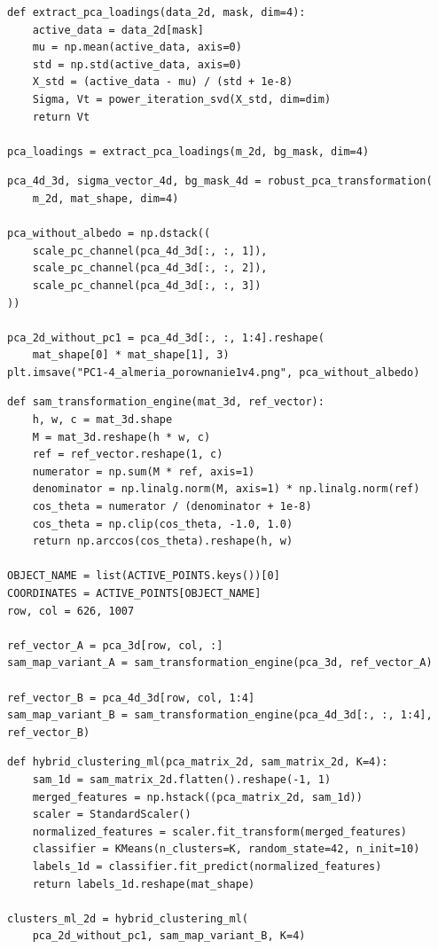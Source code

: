\documentclass[12pt,a4paper]{article}
\begin{document}
\begin{lstlisting}[caption={Calculation of PCA loadings.},label={lst:loadings}]
def extract_pca_loadings(data_2d, mask, dim=4):
    active_data = data_2d[mask]
    mu = np.mean(active_data, axis=0)
    std = np.std(active_data, axis=0)
    X_std = (active_data - mu) / (std + 1e-8)
    Sigma, Vt = power_iteration_svd(X_std, dim=dim)
    return Vt

pca_loadings = extract_pca_loadings(m_2d, bg_mask, dim=4)
\end{lstlisting}

\begin{lstlisting}[caption={Utilizing PCA components without PC1.},label={lst:pca-without-pc1}]
pca_4d_3d, sigma_vector_4d, bg_mask_4d = robust_pca_transformation(
    m_2d, mat_shape, dim=4)

pca_without_albedo = np.dstack((
    scale_pc_channel(pca_4d_3d[:, :, 1]),
    scale_pc_channel(pca_4d_3d[:, :, 2]),
    scale_pc_channel(pca_4d_3d[:, :, 3])
))

pca_2d_without_pc1 = pca_4d_3d[:, :, 1:4].reshape(
    mat_shape[0] * mat_shape[1], 3)
plt.imsave("PC1-4_almeria_porownanie1v4.png", pca_without_albedo)
\end{lstlisting}

\begin{lstlisting}[caption={Computing the SAM map.},label={lst:sam}]
def sam_transformation_engine(mat_3d, ref_vector):
    h, w, c = mat_3d.shape
    M = mat_3d.reshape(h * w, c)
    ref = ref_vector.reshape(1, c)
    numerator = np.sum(M * ref, axis=1)
    denominator = np.linalg.norm(M, axis=1) * np.linalg.norm(ref)
    cos_theta = numerator / (denominator + 1e-8)
    cos_theta = np.clip(cos_theta, -1.0, 1.0)
    return np.arccos(cos_theta).reshape(h, w)

OBJECT_NAME = list(ACTIVE_POINTS.keys())[0]
COORDINATES = ACTIVE_POINTS[OBJECT_NAME]
row, col = 626, 1007

ref_vector_A = pca_3d[row, col, :]
sam_map_variant_A = sam_transformation_engine(pca_3d, ref_vector_A)

ref_vector_B = pca_4d_3d[row, col, 1:4]
sam_map_variant_B = sam_transformation_engine(pca_4d_3d[:, :, 1:4], ref_vector_B)
\end{lstlisting}

\begin{lstlisting}[caption={K-Means segmentation on PCA and SAM features without PC1.},label={lst:kmeans-hybrid}]
def hybrid_clustering_ml(pca_matrix_2d, sam_matrix_2d, K=4):
    sam_1d = sam_matrix_2d.flatten().reshape(-1, 1)
    merged_features = np.hstack((pca_matrix_2d, sam_1d))
    scaler = StandardScaler()
    normalized_features = scaler.fit_transform(merged_features)
    classifier = KMeans(n_clusters=K, random_state=42, n_init=10)
    labels_1d = classifier.fit_predict(normalized_features)
    return labels_1d.reshape(mat_shape)

clusters_ml_2d = hybrid_clustering_ml(
    pca_2d_without_pc1, sam_map_variant_B, K=4)
\end{lstlisting}
\end{document}

